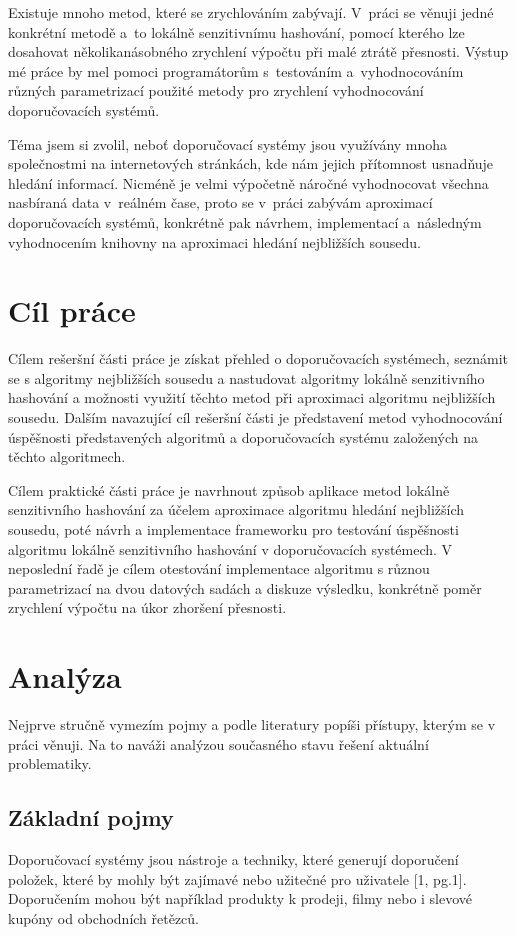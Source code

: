 \documentclass[11pt]{article}
\begin{document}
Existuje mnoho metod, které se zrychlováním zabývají. V~práci se věnuji
jedné konkrétní metodě a~to lokálně senzitivnímu hashování, pomocí kterého lze dosahovat několikanásobného zrychlení výpočtu při malé ztrátě přesnosti. Výstup mé práce by mel pomoci programátorům s~testováním a~vyhodnocováním různých parametrizací použité metody pro zrychlení vyhodnocování doporučovacích systémů.

Téma jsem si zvolil, neboť doporučovací systémy jsou využívány mnoha
společnostmi na internetových stránkách, kde nám jejich přítomnost usnadňuje
hledání informací. Nicméně je velmi výpočetně náročné vyhodnocovat
všechna nasbíraná data v~reálném čase, proto se v~práci zabývám aproximací doporučovacích systémů, konkrétně pak návrhem, implementací a~následným vyhodnocením knihovny na aproximaci hledání nejbližších sousedu.

\section{Cíl práce}
Cílem rešeršní části práce je získat přehled o doporučovacích systémech, seznámit
se s algoritmy nejbližších sousedu a nastudovat algoritmy lokálně senzitivního
hashování a možnosti využití těchto metod při aproximaci algoritmu
nejbližších sousedu. Dalším navazující cíl rešeršní části je představení metod
vyhodnocování úspěšnosti představených algoritmů a doporučovacích systému
založených na těchto algoritmech.

Cílem praktické části práce je navrhnout způsob aplikace metod lokálně
senzitivního hashování za účelem aproximace algoritmu hledání nejbližších
sousedu, poté návrh a implementace frameworku pro testování úspěšnosti
algoritmu lokálně senzitivního hashování v doporučovacích systémech. V neposlední řadě je cílem otestování implementace algoritmu s různou parametrizací na dvou datových sadách a diskuze výsledku, konkrétně poměr zrychlení výpočtu na úkor zhoršení přesnosti.

\section{Analýza}
Nejprve stručně vymezím pojmy a podle literatury popíši přístupy, kterým se v práci věnuji. Na to naváži analýzou současného stavu řešení aktuální problematiky.

\subsection{Základní pojmy}
Doporučovací systémy jsou nástroje a techniky, které generují doporučení položek, které by mohly být zajímavé nebo užitečné pro uživatele [1, pg.1]. Doporučením mohou být například produkty k prodeji, filmy nebo i slevové kupóny od obchodních řetězců.
\end{document}
